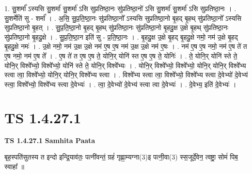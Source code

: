 \documentclass[17pt]{extarticle}
\begin{document}
1. सु॒शर्मा᳚ ऽस्यसि सु॒शर्मा॑ सु॒शर्मा॑ ऽसि सुप्रतिष्ठा॒नः सु॑प्रतिष्ठा॒नो॑ ऽसि सु॒शर्मा॑ सु॒शर्मा॑ ऽसि सुप्रतिष्ठा॒नः । . सु॒शर्मेति॑ सु - शर्मा᳚ । . अ॒सि॒ सु॒प्र॒ति॒ष्ठा॒नः सु॑प्रतिष्ठा॒नो᳚ ऽस्यसि सुप्रतिष्ठा॒नो बृ॒हद् बृ॒हथ् सु॑प्रतिष्ठा॒नो᳚ ऽस्यसि सुप्रतिष्ठा॒नो बृ॒हत् । . सु॒प्र॒ति॒ष्ठा॒नो बृ॒हद् बृ॒हथ् सु॑प्रतिष्ठा॒नः सु॑प्रतिष्ठा॒नो बृ॒हदु॒क्ष उ॒क्षे बृ॒हथ् सु॑प्रतिष्ठा॒नः सु॑प्रतिष्ठा॒नो बृ॒हदु॒क्षे । . सु॒प्र॒ति॒ष्ठा॒न इति॑ सु - प्र॒ति॒ष्ठा॒नः । . बृ॒हदु॒क्ष उ॒क्षे बृ॒हद् बृ॒हदु॒क्षे नमो॒ नम॑ उ॒क्षे बृ॒हद् बृ॒हदु॒क्षे नमः॑ । . उ॒क्षे नमो॒ नम॑ उ॒क्ष उ॒क्षे नम॑ ए॒ष ए॒ष नम॑ उ॒क्ष उ॒क्षे नम॑ ए॒षः । . नम॑ ए॒ष ए॒ष नमो॒ नम॑ ए॒ष ते॑ त ए॒ष नमो॒ नम॑ ए॒ष ते᳚ । . ए॒ष ते॑ त ए॒ष ए॒ष ते॒ योनि॒र् योनि॑ स्त ए॒ष ए॒ष ते॒ योनिः॑ । . ते॒ योनि॒र् योनि॑ स्ते ते॒ योनि॒र् विश्वे᳚भ्यो॒ विश्वे᳚भ्यो॒ योनि॑ स्ते ते॒ योनि॒र् विश्वे᳚भ्यः । . योनि॒र् विश्वे᳚भ्यो॒ विश्वे᳚भ्यो॒ योनि॒र् योनि॒र् विश्वे᳚भ्य स्त्वा त्वा॒ विश्वे᳚भ्यो॒ योनि॒र् योनि॒र् विश्वे᳚भ्य स्त्वा । . विश्वे᳚भ्य स्त्वा त्वा॒ विश्वे᳚भ्यो॒ विश्वे᳚भ्य स्त्वा दे॒वेभ्यो॑ दे॒वेभ्य॑ स्त्वा॒ विश्वे᳚भ्यो॒ विश्वे᳚भ्य स्त्वा दे॒वेभ्यः॑ । . त्वा॒ दे॒वेभ्यो॑ दे॒वेभ्य॑ स्त्वा त्वा दे॒वेभ्यः॑ । . दे॒वेभ्य॒ इति॑ दे॒वेभ्यः॑ । \newline
\pagebreak
{}
\section*{ TS 1.4.27.1 }

\textbf{TS 1.4.27.1 } \newline
\textbf{Samhita Paata} \newline

बृह॒स्पति॑सुतस्य त इन्दो इन्द्रि॒याव॑तः॒ पत्नी॑वन्तं॒ ग्रहं॑ गृह्णा॒म्यग्ना(3)इ पत्नी॒वा(3) स्स॒जूर्दे॒वेन॒ त्वष्ट्रा॒ सोमं॑ पिब॒ स्वाहा᳚ ॥ \newline
\end{document}
